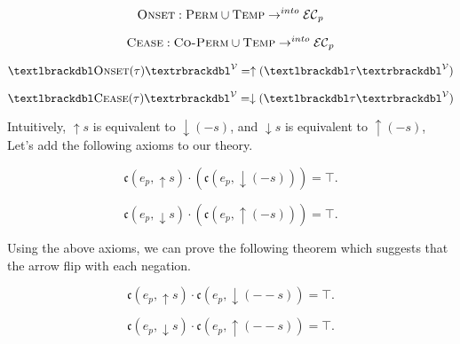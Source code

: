 \begin{defn}
    \begin{equation}
        \textsc{Onset} : \textsc{Perm} \cup \textsc{Temp} \to^{into} \mathcal{EC}_p
    \end{equation}
\end{defn}
\begin{defn}
    \begin{equation}
        \textsc{Cease} : \textsc{Co-Perm} \cup \textsc{Temp} \to^{into} \mathcal{EC}_p
    \end{equation}
\end{defn}

\begin{defn}
    \[
        \textlbrackdbl \textsc{Onset}(\tau)\textrbrackdbl^{\mathcal{V}}
        = \uparrow(\textlbrackdbl \tau \textrbrackdbl^{\mathcal{V}})
    \]
\end{defn}
\begin{defn}
    \[
        \textlbrackdbl \textsc{Cease}(\tau)\textrbrackdbl^{\mathcal{V}}
        = \downarrow(\textlbrackdbl \tau \textrbrackdbl^{\mathcal{V}})
    \]

\end{defn}

Intuitively, $\uparrow s$ is equivalent to $\downarrow(-s)$, and $\downarrow s$ is equivalent to $\uparrow(-s)$, Let's add the following axioms to our theory.
\begin{axiom}
    \begin{equation}
        \mathfrak{c}(e_p, \uparrow s) \cdot (\mathfrak{c}(e_p, \downarrow(- s))) = \top.
    \end{equation}
\end{axiom}
\begin{axiom}\label{ax:cessation}
    \begin{equation}
        \mathfrak{c}(e_p, \downarrow s) \cdot (\mathfrak{c}(e_p, \uparrow(- s))) = \top.
    \end{equation}
\end{axiom}

Using the above axioms, we can prove the following theorem which suggests that the arrow flip with each negation.

\begin{theorem}\label{thm:arrow_flip}
    \begin{equation}
        \mathfrak{c}(e_p, \uparrow s) \cdot \mathfrak{c}(e_p, \downarrow (-- s)) = \top.
    \end{equation}
\end{theorem}
\begin{theorem}
    \begin{equation}
        \mathfrak{c}(e_p, \downarrow s) \cdot \mathfrak{c}(e_p, \uparrow (-- s)) = \top.
    \end{equation}
\end{theorem}

